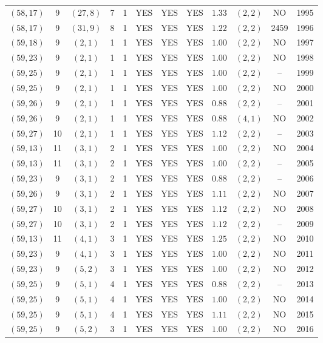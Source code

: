 \begin{longtable}{|c|c|c|c|c|c|c|c|c|c|c|c|}
$(58,17)$ & 9 & $(27,8)$ & 7 & 1 & YES & YES & YES & $1.33$ & $(2,2)$ & NO & 1995\\
$(58,17)$ & 9 & $(31,9)$ & 8 & 1 & YES & YES & YES & $1.22$ & $(2,2)$ & 2459 & 1996\\
$(59,18)$ & 9 & $(2,1)$ & 1 & 1 & YES & YES & YES & $1.00$ & $(2,2)$ & NO & 1997\\
$(59,23)$ & 9 & $(2,1)$ & 1 & 1 & YES & YES & YES & $1.00$ & $(2,2)$ & NO & 1998\\
$(59,25)$ & 9 & $(2,1)$ & 1 & 1 & YES & YES & YES & $1.00$ & $(2,2)$ & -- & 1999\\
$(59,25)$ & 9 & $(2,1)$ & 1 & 1 & YES & YES & YES & $1.00$ & $(2,2)$ & NO & 2000\\
$(59,26)$ & 9 & $(2,1)$ & 1 & 1 & YES & YES & YES & $0.88$ & $(2,2)$ & -- & 2001\\
$(59,26)$ & 9 & $(2,1)$ & 1 & 1 & YES & YES & YES & $0.88$ & $(4,1)$ & NO & 2002\\
$(59,27)$ & 10 & $(2,1)$ & 1 & 1 & YES & YES & YES & $1.12$ & $(2,2)$ & -- & 2003\\
$(59,13)$ & 11 & $(3,1)$ & 2 & 1 & YES & YES & YES & $1.00$ & $(2,2)$ & NO & 2004\\
$(59,13)$ & 11 & $(3,1)$ & 2 & 1 & YES & YES & YES & $1.00$ & $(2,2)$ & -- & 2005\\
$(59,23)$ & 9 & $(3,1)$ & 2 & 1 & YES & YES & YES & $0.88$ & $(2,2)$ & -- & 2006\\
$(59,26)$ & 9 & $(3,1)$ & 2 & 1 & YES & YES & YES & $1.11$ & $(2,2)$ & NO & 2007\\
$(59,27)$ & 10 & $(3,1)$ & 2 & 1 & YES & YES & YES & $1.12$ & $(2,2)$ & NO & 2008\\
$(59,27)$ & 10 & $(3,1)$ & 2 & 1 & YES & YES & YES & $1.12$ & $(2,2)$ & -- & 2009\\
$(59,13)$ & 11 & $(4,1)$ & 3 & 1 & YES & YES & YES & $1.25$ & $(2,2)$ & NO & 2010\\
$(59,23)$ & 9 & $(4,1)$ & 3 & 1 & YES & YES & YES & $1.00$ & $(2,2)$ & NO & 2011\\
$(59,23)$ & 9 & $(5,2)$ & 3 & 1 & YES & YES & YES & $1.00$ & $(2,2)$ & NO & 2012\\
$(59,25)$ & 9 & $(5,1)$ & 4 & 1 & YES & YES & YES & $0.88$ & $(2,2)$ & -- & 2013\\
$(59,25)$ & 9 & $(5,1)$ & 4 & 1 & YES & YES & YES & $1.00$ & $(2,2)$ & NO & 2014\\
$(59,25)$ & 9 & $(5,1)$ & 4 & 1 & YES & YES & YES & $1.11$ & $(2,2)$ & NO & 2015\\
$(59,25)$ & 9 & $(5,2)$ & 3 & 1 & YES & YES & YES & $1.00$ & $(2,2)$ & NO & 2016\\

\end{longtable}
